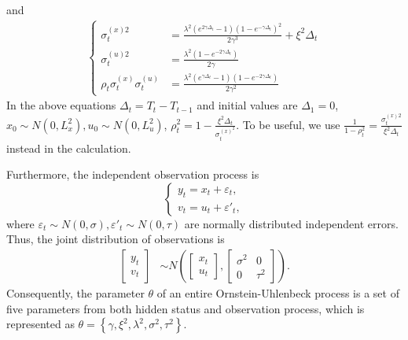 and 
\begin{align*}
\begin{cases}
\sigma_t^{(x)2} &=\frac{\lambda^2 \left(e^{2 \gamma\Delta_t}-1\right) \left(1 -e^{-\gamma\Delta_t}\right)^2}{2 \gamma ^3 } + \xi^2\Delta_t\\
\sigma_t^{(u)2} &= \frac{\lambda ^2 \left(1- e^{-2 \gamma\Delta_t}\right)}{2 \gamma } \\
\rho_t\sigma_t^{(x)}\sigma_t^{(u)} & =\frac{\lambda ^2 \left(e^{\gamma\Delta_t} -1\right) \left(1-e^{-2\gamma\Delta_t}\right)}{2 \gamma ^2}
\end{cases}
\end{align*}
In the above equations $\Delta_t = T_t-T_{t-1}$ and initial values are $\Delta_1=0$, $x_0\sim N\left(0,L_x^2\right), u_0\sim N(0,L_u^2)$, $\rho_t^2 = 1-\frac{\xi^2 \Delta_t}{\sigma_t^{(x)^2}}$. To be useful, we use $\frac{1}{1-\rho_t^2} =\frac{\sigma_t^{(x)2}}{\xi^2 \Delta_t}$ instead in the calculation. 

Furthermore, the independent observation process is 
\begin{equation}\label{obseq}
\begin{cases} y_t=x_t+\varepsilon_t,\\ v_t=u_t+\varepsilon'_t, \end{cases} 
\end{equation}
where $\varepsilon_t\sim N(0,\sigma),\varepsilon'_t\sim N(0,\tau)$ are normally distributed independent errors. Thus, the joint distribution of observations is 
\begin{align}\label{obmodel}
\begin{bmatrix} y_t \\ v_t \end{bmatrix} &\sim N\left(
\begin{bmatrix}x_t \\ u_t \end{bmatrix} , 
\begin{bmatrix}
\sigma^2 & 0\\
0 & \tau^2
\end{bmatrix} \right).
\end{align}
Consequently, the parameter $\theta$ of an entire Ornstein-Uhlenbeck process is a set of five parameters from both hidden status and observation process, which is represented as $\theta = \left\lbrace \gamma,\xi^2,\lambda^2,\sigma^2,\tau^2 \right\rbrace$. 


